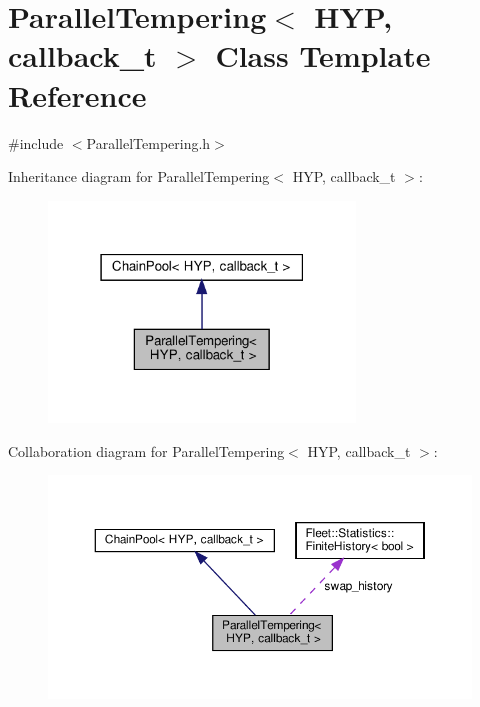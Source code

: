 \hypertarget{class_parallel_tempering}{}\section{Parallel\+Tempering$<$ H\+YP, callback\+\_\+t $>$ Class Template Reference}
\label{class_parallel_tempering}


{\ttfamily \#include $<$Parallel\+Tempering.\+h$>$}



Inheritance diagram for Parallel\+Tempering$<$ H\+YP, callback\+\_\+t $>$\+:\nopagebreak
\begin{figure}[H]
\begin{center}
\leavevmode
\includegraphics[width=231pt]{class_parallel_tempering__inherit__graph}
\end{center}
\end{figure}


Collaboration diagram for Parallel\+Tempering$<$ H\+YP, callback\+\_\+t $>$\+:\nopagebreak
\begin{figure}[H]
\begin{center}
\leavevmode
\includegraphics[width=350pt]{class_parallel_tempering__coll__graph}
\end{center}
\end{figure}
